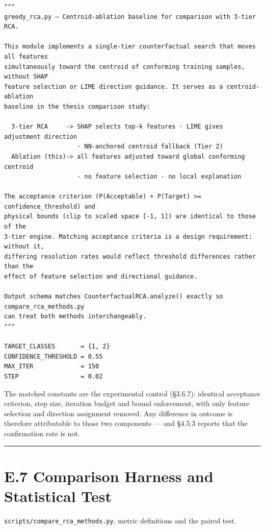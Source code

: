 \begin{verbatim}
"""
greedy_rca.py — Centroid-ablation baseline for comparison with 3-tier RCA.

This module implements a single-tier counterfactual search that moves all features
simultaneously toward the centroid of conforming training samples, without SHAP
feature selection or LIME direction guidance. It serves as a centroid-ablation
baseline in the thesis comparison study:

  3-tier RCA     -> SHAP selects top-k features · LIME gives adjustment direction
                    · NN-anchored centroid fallback (Tier 2)
  Ablation (this)-> all features adjusted toward global conforming centroid
                    · no feature selection · no local explanation

The acceptance criterion (P(Acceptable) + P(Target) >= confidence_threshold) and
physical bounds (clip to scaled space [-1, 1]) are identical to those of the
3-tier engine. Matching acceptance criteria is a design requirement: without it,
differing resolution rates would reflect threshold differences rather than the
effect of feature selection and directional guidance.

Output schema matches CounterfactualRCA.analyze() exactly so compare_rca_methods.py
can treat both methods interchangeably.
"""

TARGET_CLASSES       = {1, 2}
CONFIDENCE_THRESHOLD = 0.55
MAX_ITER             = 150
STEP                 = 0.02
\end{verbatim}

The matched constants are the experimental control (§3.6.7): identical acceptance criterion, step size, iteration budget and bound enforcement, with only feature selection and direction assignment removed. Any difference in outcome is therefore attributable to those two components --- and §4.5.3 reports that the confirmation rate is not.

\begin{center}\rule{0.5\linewidth}{0.5pt}\end{center}

\hypertarget{e.7-comparison-harness-and-statistical-test}{%
\section{E.7 Comparison Harness and Statistical Test}\label{e.7-comparison-harness-and-statistical-test}}

\texttt{scripts/compare\_rca\_methods.py}, metric definitions and the paired test.

